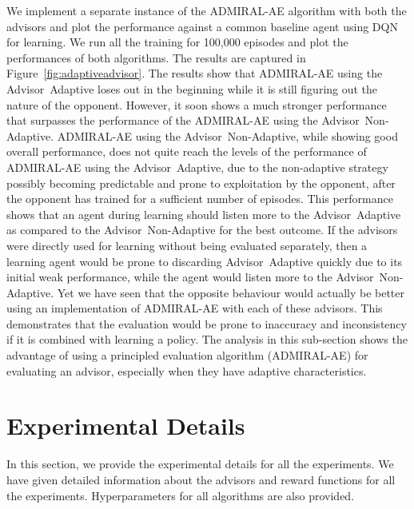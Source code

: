 \documentclass[jair, twoside,11pt,theapa]{article}
\begin{document}
We implement a separate instance of the ADMIRAL-AE algorithm with both the advisors and plot the performance against a common baseline agent using DQN for learning. We run all the training for 100,000 episodes and plot the performances of both algorithms. The results are captured in Figure~\ref{fig:adaptiveadvisor}. The results show that ADMIRAL-AE using the Advisor~Adaptive loses out in the beginning while it is still figuring out the nature of the opponent. However, it soon shows a much stronger performance that surpasses the performance of the ADMIRAL-AE using the Advisor~Non-Adaptive. ADMIRAL-AE using the Advisor~Non-Adaptive, while showing good overall performance, does not quite reach the levels of the performance of ADMIRAL-AE using the Advisor~Adaptive, due to the non-adaptive strategy possibly becoming predictable and prone to exploitation by the opponent, after the opponent has trained for a sufficient number of episodes. This performance shows that an agent during learning should listen more to the Advisor~Adaptive as compared to the Advisor~Non-Adaptive for the best outcome. If the advisors were directly used for learning without being evaluated separately, then a learning agent would be prone to discarding Advisor~Adaptive quickly due to its initial weak performance, while the agent would listen more to the Advisor~Non-Adaptive. Yet we have seen that the opposite behaviour would actually be better using an implementation of ADMIRAL-AE with each of these advisors. This demonstrates that the evaluation would be prone to inaccuracy and inconsistency if it is combined with learning a policy. The analysis in this sub-section shows the advantage of using a principled evaluation algorithm (ADMIRAL-AE) for evaluating an advisor, especially when they have adaptive characteristics. 









\section{Experimental Details}\label{appendix:experimentaldetails}

In this section, we provide the experimental details for all the experiments. We have given detailed information about the advisors and reward functions for all the experiments. Hyperparameters for all algorithms are also provided.  
\end{document}
